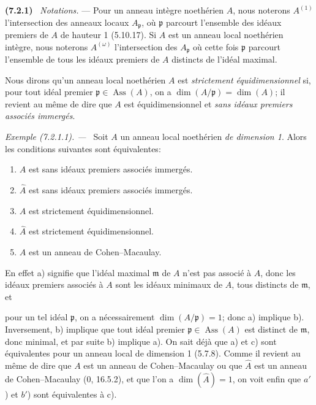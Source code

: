 \documentclass[10pt,oneside]{book}
\newcommand{\oldpage}[2][]{%
  \setcounter{footnote}{0}%
  \marginpar{\scriptsize\textbf{#1}~|~#2}\ignorespaces}
\newenvironment{env}[1][]{\par\medskip\noindent\textbf{(#1)}\ }{\par}
\newenvironment{example}[1][]{%
  \par\medskip\noindent\textit{Exemple (#1). ---\ }}{\par}
\begin{document}
\begin{env}[7.2.1]
\label{IV.2.s7.2.1-fr}
\emph{Notations.} --- Pour un anneau intègre noethérien $A$, nous noterons
$A^{(1)}$ l'intersection des anneaux locaux $A_{\mathfrak p}$, où
$\mathfrak p$ parcourt l'ensemble des idéaux premiers de $A$ de hauteur 1
(5.10.17). Si $A$ est un anneau local noethérien intègre, nous noterons
$A^{(\omega)}$ l'intersection des $A_{\mathfrak p}$ où cette fois
$\mathfrak p$ parcourt l'ensemble de tous les idéaux premiers de $A$
distincts de l'idéal maximal.

Nous dirons qu'un anneau local noethérien $A$ est \emph{strictement
équidimensionnel} si, pour tout idéal premier
$\mathfrak p\in\operatorname{Ass}(A)$, on a
$\dim(A/\mathfrak p)=\dim(A)$; il revient au même de dire que $A$ est
équidimensionnel et \emph{sans idéaux premiers associés immergés}.
\end{env}

\begin{example}[7.2.1.1]
\label{IV.2.s7.2.1.1-fr}
Soit $A$ un anneau local noethérien \emph{de dimension 1}. Alors les
conditions suivantes sont équivalentes:
\begin{enumerate}
\item[a)] $A$ est sans idéaux premiers associés immergés.
\item[$a'$)] $\widehat A$ est sans idéaux premiers associés immergés.
\item[b)] $A$ est strictement équidimensionnel.
\item[$b'$)] $\widehat A$ est strictement équidimensionnel.
\item[c)] $A$ est un anneau de Cohen--Macaulay.
\end{enumerate}
\end{example}

En effet a) signifie que l'idéal maximal $\mathfrak m$ de $A$ n'est pas
associé à $A$, donc les idéaux premiers associés à $A$ sont les idéaux
minimaux de $A$, tous distincts de $\mathfrak m$, et

\oldpage[IV-2]{188}

pour un tel idéal $\mathfrak p$, on a nécessairement
$\dim(A/\mathfrak p)=1$; donc a) implique b). Inversement, b) implique que
tout idéal premier $\mathfrak p\in\operatorname{Ass}(A)$ est distinct de
$\mathfrak m$, donc minimal, et par suite b) implique a). On sait déjà que
a) et c) sont équivalentes pour un anneau local de dimension 1 (5.7.8).
Comme il revient au même de dire que $A$ est un anneau de Cohen--Macaulay ou
que $\widehat A$ est un anneau de Cohen--Macaulay (0, 16.5.2), et que l'on
a $\dim(\widehat A)=1$, on voit enfin que $a'$) et $b'$) sont équivalentes à
c).
\end{document}
